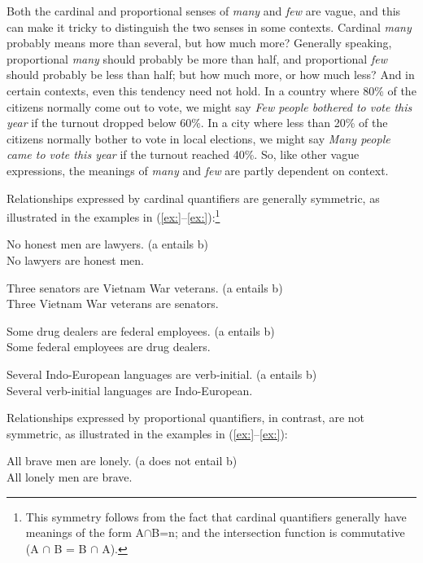 Both the cardinal and proportional senses of \textit{many} and \textit{few} are vague, and this can make it tricky to distinguish the two senses in some contexts. Cardinal \textit{many} probably means more than several, but how much more? Generally speaking, proportional \textit{many} should probably be more than half, and proportional \textit{few} should probably be less than half; but how much more, or how much less? And in certain contexts, even this tendency need not hold. In a country where 80\% of the citizens normally come out to vote, we might say \textit{Few people bothered to vote this year} if the turnout dropped below 60\%. In a city where less than 20\% of the citizens normally bother to vote in local elections, we might say \textit{Many people came to vote this year} if the turnout reached 40\%. So, like other vague expressions, the meanings of \textit{many} and \textit{few} are partly dependent on context.



Relationships expressed by cardinal quantifiers are generally symmetric, as illustrated in the examples in (\ref{ex:}--\ref{ex:}):\footnote{This symmetry follows from the fact that cardinal quantifiers generally have meanings of the form {\textbar}A${\cap}$B{\textbar}=n; and the intersection function is commutative (A ${\cap}$ B = B ${\cap}$ A).}


\ea
\ea No honest men are lawyers.   (a entails b)\\
\ex No lawyers are honest men.
                       \z
\z

\ea
\ea Three senators are Vietnam War veterans.   (a entails b)\\
\ex Three Vietnam War veterans are senators.
\z \z

\ea
\ea Some drug dealers are federal employees.   (a entails b)\\
\ex Some federal employees are drug dealers.
\z \z

\ea
\ea Several Indo-European languages are verb-initial.   (a entails b)\\
\ex Several verb-initial languages are Indo-European.
                       \z
\z


Relationships expressed by proportional quantifiers, in contrast, are not symmetric, as illustrated in the examples in (\ref{ex:}--\ref{ex:}):


\ea
\ea All brave men are lonely.   (a does not entail b)\\
\ex All lonely men are brave.
                       \z
\z

